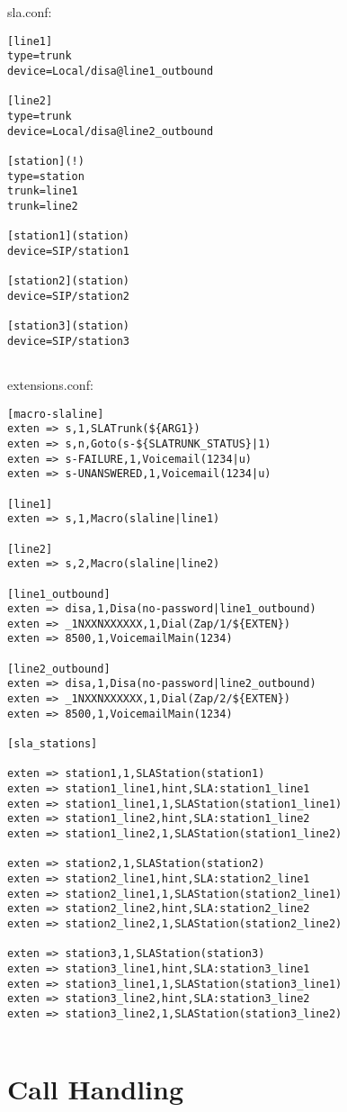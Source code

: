 sla.conf:
\begin{verbatim}
[line1]
type=trunk
device=Local/disa@line1_outbound

[line2]
type=trunk
device=Local/disa@line2_outbound

[station](!)
type=station
trunk=line1
trunk=line2

[station1](station)
device=SIP/station1

[station2](station)
device=SIP/station2

[station3](station)
device=SIP/station3
	
\end{verbatim}


extensions.conf:
\begin{verbatim}
[macro-slaline]
exten => s,1,SLATrunk(${ARG1})
exten => s,n,Goto(s-${SLATRUNK_STATUS}|1)
exten => s-FAILURE,1,Voicemail(1234|u)
exten => s-UNANSWERED,1,Voicemail(1234|u)

[line1]
exten => s,1,Macro(slaline|line1)

[line2]
exten => s,2,Macro(slaline|line2)

[line1_outbound]
exten => disa,1,Disa(no-password|line1_outbound)
exten => _1NXXNXXXXXX,1,Dial(Zap/1/${EXTEN})
exten => 8500,1,VoicemailMain(1234)

[line2_outbound]
exten => disa,1,Disa(no-password|line2_outbound)
exten => _1NXXNXXXXXX,1,Dial(Zap/2/${EXTEN})
exten => 8500,1,VoicemailMain(1234)

[sla_stations]

exten => station1,1,SLAStation(station1)
exten => station1_line1,hint,SLA:station1_line1
exten => station1_line1,1,SLAStation(station1_line1)
exten => station1_line2,hint,SLA:station1_line2
exten => station1_line2,1,SLAStation(station1_line2)

exten => station2,1,SLAStation(station2)
exten => station2_line1,hint,SLA:station2_line1
exten => station2_line1,1,SLAStation(station2_line1)
exten => station2_line2,hint,SLA:station2_line2
exten => station2_line2,1,SLAStation(station2_line2)

exten => station3,1,SLAStation(station3)
exten => station3_line1,hint,SLA:station3_line1
exten => station3_line1,1,SLAStation(station3_line1)
exten => station3_line2,hint,SLA:station3_line2
exten => station3_line2,1,SLAStation(station3_line2)
	
\end{verbatim}

\section{Call Handling}

